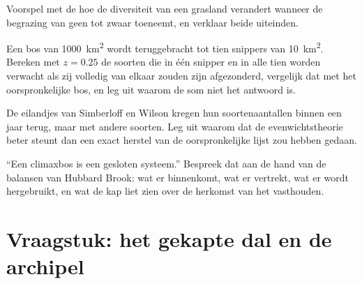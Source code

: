\begin{exercise}[$\star\star$]\label{exo:b1:ecosystem-dynamics:9}
Voorspel met de  hoe de diversiteit van een
grasland verandert wanneer de begrazing van geen tot zwaar toeneemt, en
verklaar beide uiteinden.
\end{exercise}

\begin{exercise}[$\star\star\star$]\label{exo:b1:ecosystem-dynamics:10}
Een bos van \qty{1000}{km^2} wordt teruggebracht tot tien snippers van
\qty{10}{km^2}. Bereken met $z = 0.25$ de soorten die in één snipper en in
alle tien worden verwacht als zij volledig van elkaar zouden zijn
afgezonderd, vergelijk dat met het oorspronkelijke bos, en leg uit waarom de
som niet het antwoord is.
\end{exercise}

\begin{exercise}[$\star\star\star$]\label{exo:b1:ecosystem-dynamics:11}
De eilandjes van Simberloff en Wilson kregen hun soortenaantallen binnen een
jaar terug, maar met andere soorten. Leg uit waarom dat de evenwichtstheorie
beter steunt dan een exact herstel van de oorspronkelijke lijst zou hebben
gedaan.
\end{exercise}

\begin{exercise}[$\star\star\star$]\label{exo:b1:ecosystem-dynamics:12}
``Een climaxbos is een gesloten systeem.'' Bespreek dat aan de hand van de
balansen van Hubbard Brook: wat er binnenkomt, wat er vertrekt, wat er
wordt hergebruikt, en wat de kap liet zien over de herkomst van het
vasthouden.
\end{exercise}

\section{Vraagstuk: het gekapte dal en de archipel}


